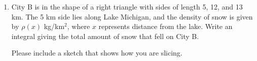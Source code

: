 \documentclass{article}
\begin{document}
\begin{enumerate}
\begin{enumerate}
    \begin{solution}
      We are asked to evaluate $\displaystyle \int_0^5 \frac{2 \pi
        x}{\sqrt{x + 4}}\,dx$.  Let's substitute ; then,
       and :
      \begin{align*}
        \int_0^5 \frac{2 \pi \sube{x}}{\sqrt{\sub{x + 4}}}\,\subd{dx} &=
        \int_4^9 \frac{2 \pi 
          (\sube{u - 4})}{\sqrt{\sub{u}}}\,\subd{du} \\
        &= 2 \pi \int_4^9 \left( u^{1/2} - 4 u^{-1/2} \right)\,du \\
        &= \left.  2 \pi \left( \frac{2}{3} u^{3/2} - 8 u^{1/2} \right)
        \right|_4^9 \\
        &= 2 \pi \left[ \left( \frac{2}{3} \cdot 27 - 8 \cdot 3 \right) -
          \left( \frac{2}{3} \cdot 8 - 8 \cdot 2 \right) \right] \\ 
        &= \boxed{\frac{28 \pi}{3}}
      \end{align*}
    \end{solution}

  \item 

    \begin{problem}[\newpage]
      City B is in the shape of a right triangle with sides of length 5,
      12, and 13 km.  The 5 km side lies along Lake Michigan, and the
      density of snow is given by $\rho(x)$ kg/km$^2$, where $x$
      represents distance from the lake.  Write an integral giving the
      total amount of snow that fell on City B.

      Please include a sketch that shows how you are slicing. 
    \end{problem}


\end{enumerate}
\end{enumerate}
\end{document}
